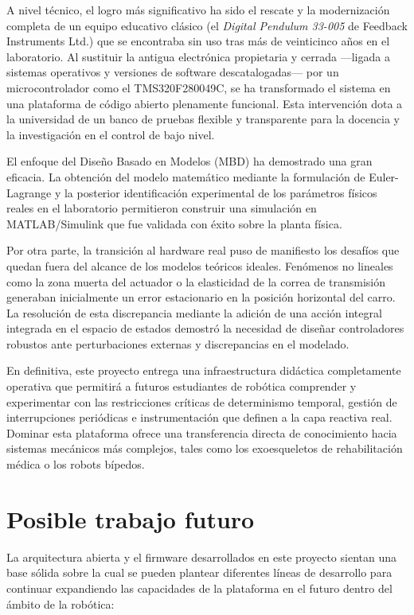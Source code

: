 \documentclass[11pt,fleqn]{book} %
\begin{document}
A nivel técnico, el logro más significativo ha sido el rescate y la modernización completa de un equipo educativo clásico (el \textit{Digital Pendulum 33-005} de Feedback Instruments Ltd.) que se encontraba sin uso tras más de veinticinco años en el laboratorio. Al sustituir la antigua electrónica propietaria y cerrada —ligada a sistemas operativos y versiones de software descatalogadas— por un microcontrolador como el TMS320F280049C, se ha transformado el sistema en una plataforma de código abierto plenamente funcional. Esta intervención dota a la universidad de un banco de pruebas flexible y transparente para la docencia y la investigación en el control de bajo nivel.

El enfoque del Diseño Basado en Modelos (MBD) ha demostrado una gran eficacia. La obtención del modelo matemático mediante la formulación de Euler-Lagrange y la posterior identificación experimental de los parámetros físicos reales en el laboratorio  permitieron construir una simulación en MATLAB/Simulink que fue validada con éxito sobre la planta física. 

Por otra parte, la transición al hardware real puso de manifiesto los desafíos que quedan fuera del alcance de los modelos teóricos ideales. Fenómenos no lineales como la zona muerta del actuador o la elasticidad de la correa de transmisión generaban inicialmente un error estacionario en la posición horizontal del carro. La resolución de esta discrepancia mediante la adición de una acción integral integrada en el espacio de estados demostró la necesidad de diseñar controladores robustos ante perturbaciones externas y discrepancias en el modelado. 

En definitiva, este proyecto entrega una infraestructura didáctica completamente operativa que permitirá a futuros estudiantes de robótica comprender y experimentar con las restricciones críticas de determinismo temporal, gestión de interrupciones periódicas e instrumentación que definen a la capa reactiva real. Dominar esta plataforma ofrece una transferencia directa de conocimiento hacia sistemas mecánicos más complejos, tales como los exoesqueletos de rehabilitación médica o los robots bípedos.

\section{Posible trabajo futuro}
La arquitectura abierta y el firmware desarrollados en este proyecto sientan una base sólida sobre la cual se pueden plantear diferentes líneas de desarrollo para continuar expandiendo las capacidades de la plataforma en el futuro dentro del ámbito de la robótica:
\end{document}
